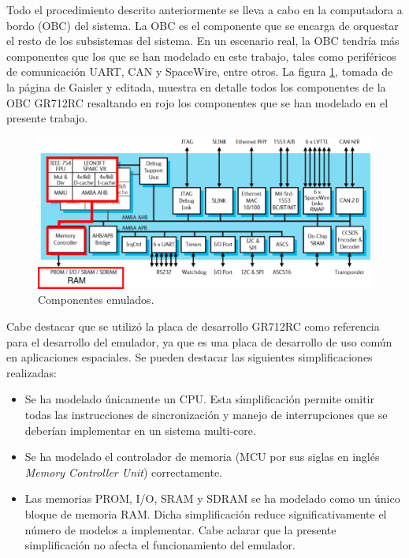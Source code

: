 \newpage

Todo el procedimiento descrito anteriormente se lleva a cabo en la computadora a bordo (OBC) del sistema. La OBC es el componente que se encarga de orquestar el resto de los subsistemas del sistema. En un escenario real, la OBC tendría más componentes que los que se han modelado en este trabajo, tales como periféricos de comunicación UART, CAN y SpaceWire, entre otros. La figura \ref{fig:componentes_desarrollados}, tomada de la página de Gaisler \citep{GR712RC} y editada, muestra en detalle todos los componentes de la OBC GR712RC resaltando en rojo los componentes que se han modelado en el presente trabajo.


\begin{figure}[htbp]
	\centering
	\includegraphics[width=1\textwidth]{./Figures/componentes_desarrollados}
	\caption{Componentes emulados.}
	\label{fig:componentes_desarrollados}
\end{figure}
\newpage

Cabe destacar que se utilizó la placa de desarrollo GR712RC como referencia para el desarrollo del emulador, ya que es una placa de desarrollo de uso común en aplicaciones espaciales. Se pueden destacar las siguientes simplificaciones realizadas:

\begin{itemize}
\item Se ha modelado únicamente un CPU. Esta simplificación permite omitir todas las instrucciones de sincronización y manejo de interrupciones que se deberían implementar en un sistema multi-core.
\item Se ha modelado el controlador de memoria (MCU por sus siglas en inglés \textit{Memory Controller Unit}) correctamente.
\item Las memorias PROM, I/O, SRAM y SDRAM se ha modelado como un único bloque de memoria RAM. Dicha simplificación reduce significativamente el número de modelos a implementar. Cabe aclarar que la presente simplificación no afecta el funcionamiento del emulador.
\end{itemize}


